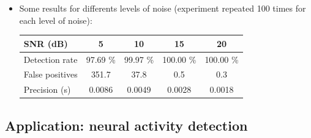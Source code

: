 \documentclass[8pt]{beamer}
\begin{document}
\begin{frame}
\begin{itemize}
\item<2-> Some results for differents levels of noise (experiment repeated 100 times 
for each level of noise):\\[.2cm]

\begin{center}
\begin{tabular}{|l|c|c|c|c|}
\hline 
SNR (dB)                     & 5         & 10        & 15        &   20      \\
\hline
\hline
Detection rate               & 97.69 \%  & 99.97 \%  & 100.00 \% & 100.00 \% \\
\hline
False positives              & 351.7     & 37.8      & 0.5       & 0.3       \\
\hline
Precision (s)                & 0.0086    & 0.0049    & 0.0028    & 0.0018    \\
\hline
\end{tabular}
\end{center}

\end{itemize}

\end{frame}

\subsection{Application: neural activity detection}
\end{document}
